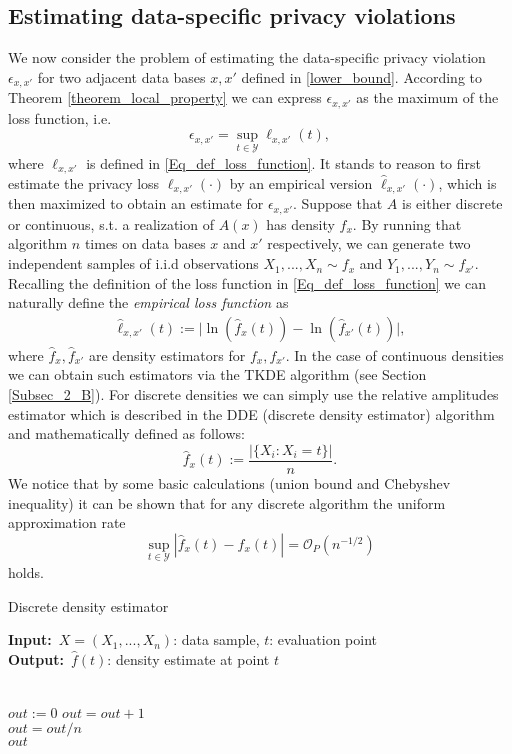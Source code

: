 \documentclass[conference]{IEEEtran}
\renewcommand{\algorithmicrequire}{\textbf{Input:}}
\renewcommand{\algorithmicensure}{\textbf{Output:}}
\begin{document}
\subsection{Estimating data-specific privacy violations} \label{subsec_41}

We now consider the problem of estimating the data-specific privacy violation $\epsilon_{x,x'}$ for two  adjacent data bases $x,x'$ defined in \eqref{lower_bound}. According to Theorem \ref{theorem_local_property} we can express $\epsilon_{x,x'}$ as the maximum of the loss function, i.e.
$$
\epsilon_{x,x'}=\sup_{t \in \mathcal{Y}} \ell_{x,x'}(t),
$$ 
where $ \ell_{x,x'}$ is defined in \eqref{Eq_def_loss_function}.
It stands to reason to first estimate the privacy loss $\ell_{x,x'}(\cdot)$ by an empirical version $\hat \ell_{x,x'}(\cdot)$, which is then maximized to obtain an estimate for $\epsilon_{x,x'}$. Suppose that $A$ is either discrete or continuous, s.t. a realization of $A(x)$ has density $f_x$. By running that algorithm $n$ times on data bases $x$ and $x'$ respectively, we can generate two independent samples of i.i.d observations $X_1,...,X_n \sim f_x$ and $Y_1,...,Y_n \sim f_{x'}$. Recalling the definition of the loss function in \eqref{Eq_def_loss_function} we can naturally define the \textit{empirical loss function} as
\begin{align} \label{Eq_def_emp_loss}
\hat{\ell}_{x,x'}(t) := \big| \ln (\hat f_x(t)) - \ln (\hat f_{x'}(t)) \big|,
\end{align}
where $\hat f_x, \hat f_{x'}$ are  density estimators for $f_x, f_{x'}$. In the case of continuous densities we can obtain such estimators via the TKDE algorithm (see Section \ref{Subsec_2_B}). For discrete densities we can simply use the relative amplitudes estimator which is described in the DDE (discrete density estimator) algorithm and mathematically defined as follows:
$$
\hat f_x (t) := \frac{|\{X_i: X_i=t\}|}{n}.
$$
We notice that by some basic calculations (union bound and Chebyshev inequality) it can be shown that for any discrete algorithm the uniform approximation rate
\begin{equation}\label{Eq_DDE_rate}
\sup_{t \in \mathcal{Y}} |\hat f_x (t)- f_x (t)| = \mathcal{O}_P(n^{-1/2})
\end{equation}
holds. 

\begin{algorithm}
	\caption{Discrete density estimator} \label{DDE}
	\small
	\algorithmicrequire \, $X=(X_1,...,X_n)$: data sample,   $t$: evaluation point \\
	\algorithmicensure \, $\hat{f}(t)$: density estimate at point $t$
	\begin{algorithmic}[1]
	\\
	    $out := 0$
				\State $out = out+ 1$
			\EndIf
		\EndFor \\
    
	$out = out/n$ \\
		\Return $out$
	\EndFunction
	\end{algorithmic} 
\end{algorithm}
\end{document}
